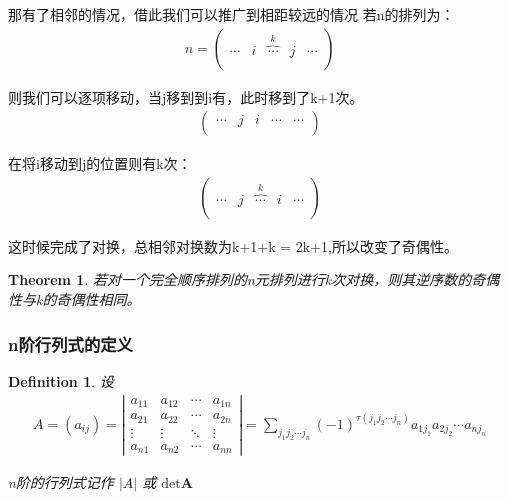 \documentclass[10pt, a4paper, oneside, UTF8]{ctexbook}
\newtheorem{theorem}{Theorem}[section]
\newtheorem{definition}{Definition}[section]
\begin{document}
那有了相邻的情况，借此我们可以推广到相距较远的情况
若n的排列为：
\begin{align}
  n =
  \begin{pmatrix}
    \cdots&i&\overbrace{\cdots}^{k}&j&\cdots \\
  \end{pmatrix}
\end{align}

则我们可以逐项移动，当j移到到i有，此时移到了k+1次。
\begin{align}
  \begin{pmatrix}
    \cdots&j&i&\cdots&\cdots \\
  \end{pmatrix}
\end{align}

在将i移动到j的位置则有k次：
\begin{align}
  \begin{pmatrix}
    \cdots&j&\overbrace{\cdots}^{k}&i&\cdots \\
  \end{pmatrix}
\end{align}

这时候完成了对换，总相邻对换数为k+1+k = 2k+1,所以改变了奇偶性。

\begin{theorem}
  若对一个完全顺序排列的n元排列进行k次对换，则其逆序数的奇偶性与k的奇偶性相同。
\end{theorem}

\subsubsection{n阶行列式的定义}

\begin{definition}
  设
  \begin{align}
    A = (a_{ij})  = \left|
    \begin{matrix}
      a_{11} & a_{12} & \cdots & a_{1n} \\
      a_{21} & a_{22} & \cdots & a_{2n} \\
      \vdots & \vdots & \ddots & \vdots \\
      a_{n1} & a_{n2} & \cdots & a_{nn}
    \end{matrix}\right| = \sum\limits_{j_1j_2 \cdots
    j_n}^{}(-1)^{\tau(j_1j_2 \cdots j_n)}a_{1j_1}a_{2j_2}\cdots a_{nj_n}
  \end{align}

  n阶的行列式记作 $\left|A\right|$ 或 $\mathrm{det} \textbf{A}$
\end{definition}
\end{document}
